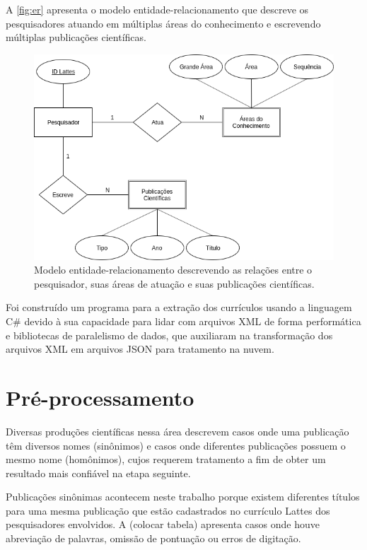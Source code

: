 A \autoref{fig:er} apresenta o modelo entidade-relacionamento que descreve os pesquisadores atuando em múltiplas áreas do conhecimento e escrevendo múltiplas publicações científicas.

\begin{figure}[htpb]
  \centering
  \includegraphics[scale=.5]{figuras/diagrama-er}
  \caption{Modelo entidade-relacionamento descrevendo as relações entre o pesquisador, suas áreas de atuação e suas publicações científicas.}
  \label{fig:er}
\end{figure}

Foi construído um programa para a extração dos currículos usando a linguagem C\# devido à sua capacidade para lidar com arquivos XML de forma performática e bibliotecas de paralelismo de dados, que auxiliaram na transformação dos arquivos XML em arquivos JSON para tratamento na nuvem.

\section{Pré-processamento}

Diversas produções científicas nessa área \cite{franceschet2011collaboration} \cite{mena2013prospecccao} \cite{reuther2006managing} descrevem casos onde uma publicação têm diversos nomes (sinônimos) e casos onde diferentes publicações possuem o mesmo nome (homônimos), cujos requerem tratamento a fim de obter um resultado mais confiável na etapa seguinte.

Publicações sinônimas acontecem neste trabalho porque existem diferentes títulos para uma mesma publicação que estão cadastrados no currículo Lattes dos pesquisadores envolvidos. A (colocar tabela) apresenta casos onde houve abreviação de palavras, omissão de pontuação ou erros de digitação.

